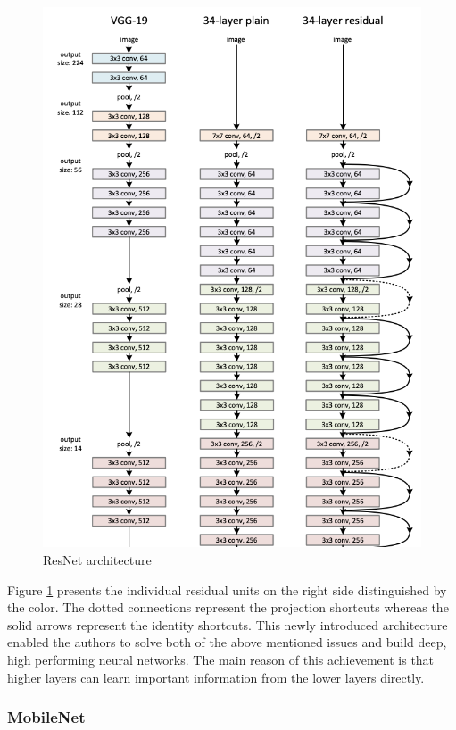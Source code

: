 \begin{figure}
  \centering
  \includegraphics[width=\linewidth]{figures/resnet.png}
  \caption{ResNet architecture}
  \label{fig:resnet}
\end{figure}

Figure \ref{fig:resnet} presents the individual residual units on the right side distinguished by the color. The dotted connections represent the projection shortcuts whereas the solid arrows represent the identity shortcuts.
This newly introduced architecture enabled the authors to solve both of the above mentioned issues and build deep, high performing neural networks. The main reason of this achievement is that higher layers can learn important information from the lower layers directly.

\subsubsection{MobileNet}\label{mobilenet}

